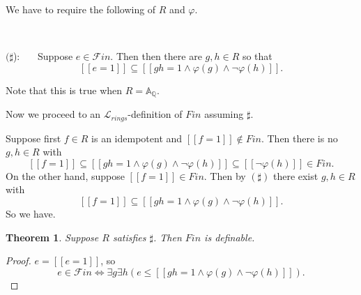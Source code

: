 \documentclass[12pt]{amsart}
\def\A{\mathbb{A}}
\def\cL{\mathcal{L}}
\def\A{\mathbb{A}}
\def\Q{\mathbb{Q}}
\def\cL{\mathcal{L}}
\newtheorem{thm}{Theorem}[section]
\numberwithin{equation}{section}
\begin{document}
We have to require the following of $R$ and $\varphi$. 

\

$(\sharp$):~~~ Suppose $e\in \mathcal{F}in$. Then then there are $g,h\in R$ so that 
$$[[e=1]]\subseteq [[gh=1 \wedge \varphi(g) \wedge \neg \varphi(h)]].$$

Note that this is true when $R=\A_{\Q}$.

Now we proceed to an $\cL_{rings}$-definition of $Fin$ assuming $\sharp$.

Suppose first $f\in R$ is an idempotent and $[[f=1]]\notin Fin$. Then there is no $g,h\in R$ with
$$[[f=1]]\subseteq [[gh=1 \wedge \varphi(g) \wedge \neg \varphi(h)]] \subseteq [[\neg \varphi(h)]] \in Fin.$$
On the other hand, suppose $[[f=1]]\in Fin$. Then by $(\sharp)$ there exist $g,h \in R$ with
$$[[f=1]]\subseteq [[gh=1 \wedge \varphi(g) \wedge \neg \varphi(h)]].$$
So we have.

\begin{thm}\label{def-fin} Suppose $R$ satisfies $\sharp$. Then $Fin$ is definable.\end{thm}
\begin{proof} $e=[[e=1]]$, so
$$e\in \mathcal{F}in \Leftrightarrow \exists g \exists h (e\leq [[gh=1 \wedge \varphi(g) \wedge \neg \varphi(h)]]).$$ 
\end{proof}





 











\end{document}
